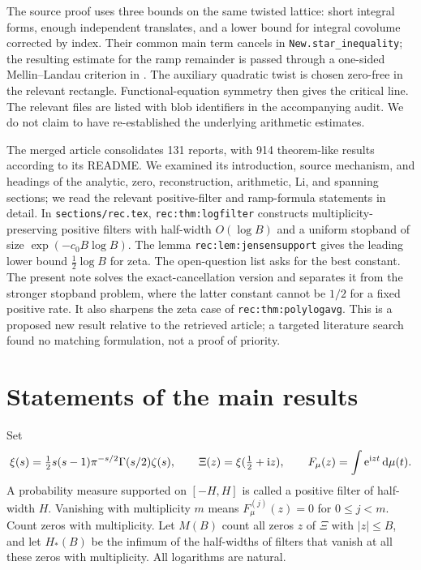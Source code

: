 \documentclass[11pt]{article}
\theoremstyle{remark}\newtheorem{remark}[theorem]{Remark}
\begin{document}
The source proof uses three bounds on the same twisted lattice: short integral forms, enough independent translates, and a lower bound for integral covolume corrected by index. Their common main term cancels in \texttt{New.star\_inequality}; the resulting estimate for the ramp remainder is passed through a one-sided Mellin--Landau criterion in . The auxiliary quadratic twist is chosen zero-free in the relevant rectangle. Functional-equation symmetry then gives the critical line. The relevant files are listed with blob identifiers in the accompanying audit. We do not claim to have re-established the underlying arithmetic estimates.

The merged article \cite{article} consolidates 131 reports, with 914 theorem-like results according to its README. We examined its introduction, source mechanism, and headings of the analytic, zero, reconstruction, arithmetic, Li, and spanning sections; we read the relevant positive-filter and ramp-formula statements in detail. In \texttt{sections/rec.tex}, \texttt{rec:thm:logfilter} constructs multiplicity-preserving positive filters with half-width $O(\log B)$ and a uniform stopband of size $\exp(-c_0B\log B)$. The lemma \texttt{rec:lem:jensensupport} gives the leading lower bound $\frac12\log B$ for zeta. The open-question list asks for the best constant. The present note solves the exact-cancellation version and separates it from the stronger stopband problem, where the latter constant cannot be $1/2$ for a fixed positive rate. It also sharpens the zeta case of \texttt{rec:thm:polylogavg}. This is a proposed new result relative to the retrieved article; a targeted literature search found no matching formulation, not a proof of priority.

\section{Statements of the main results}
Set
\begin{equation}\label{eq:xi}
\xi(s)=\tfrac12s(s-1)\pi^{-s/2}\Gamma(s/2)\zeta(s),\qquad
\Xi(z)=\xi(\tfrac12+\mathrm i z),\qquad F_\mu(z)=\int \mathrm e^{\mathrm i zt}\,\mathrm d\mu(t).
\end{equation}
A probability measure supported on $[-H,H]$ is called a positive filter of half-width $H$. Vanishing with multiplicity $m$ means $F_\mu^{(j)}(z)=0$ for $0\le j<m$. Count zeros with multiplicity. Let $M(B)$ count all zeros $z$ of $\Xi$ with $|z|\le B$, and let $H_*(B)$ be the infimum of the half-widths of filters that vanish at all these zeros with multiplicity. All logarithms are natural.
\end{document}
